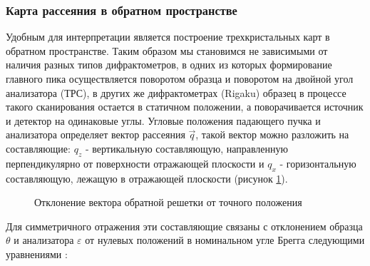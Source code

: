 \subsubsection{Карта рассеяния в обратном пространстве}
Удобным для интерпретации является построение трехкристальных карт в обратном пространстве.  Таким
образом мы становимся не зависимыми от наличия разных типов дифрактометров, в одних из которых
формирование главного пика осуществляется поворотом образца и поворотом на двойной угол анализатора (ТРС),
в других же дифрактометрах (Rigaku) образец в процессе такого сканирования остается в статичном положении,
а поворачивается источник и детектор на одинаковые углы. Угловые положения падающего пучка и анализатора
определяет вектор рассеяния $\vec{q}$, такой вектор можно разложить на составляющие: $q_z$ - вертикальную составляющую,
направленную перпендикулярно от поверхности отражающей плоскости и $q_x$ - горизонтальную составляющую,
лежащую в отражающей плоскости (рисунок \ref{ris:q_vector_reciprocal_space}).

\begin{figure}[H]
  \centering
  \hfill
  \hfill
  \caption{Отклонение вектора обратной решетки от точного положения}
  \label{ris:q_vector_reciprocal_space}
\end{figure}

Для симметричного отражения эти составляющие связаны с отклонением образца $\theta$ и
анализатора $\varepsilon$ от нулевых положений в номинальном угле Брегга следующими
уравнениями \cite{Tanner_1998}:

